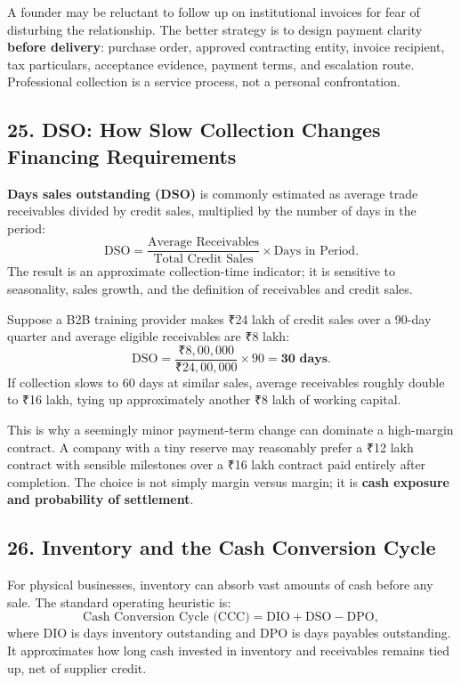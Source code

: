 A founder may be reluctant to follow up on institutional invoices for fear of disturbing the relationship. The better strategy is to design payment clarity \textbf{before delivery}: purchase order, approved contracting entity, invoice recipient, tax particulars, acceptance evidence, payment terms, and escalation route. Professional collection is a service process, not a personal confrontation.

\subsection*{25. DSO: How Slow Collection Changes Financing Requirements}

\textbf{Days sales outstanding (DSO)} is commonly estimated as average trade receivables divided by credit sales, multiplied by the number of days in the period:
\begin{equation}
\text{DSO} = \frac{\text{Average Receivables}}{\text{Total Credit Sales}} \times \text{Days in Period}.
\end{equation}
The result is an approximate collection-time indicator; it is sensitive to seasonality, sales growth, and the definition of receivables and credit sales.

Suppose a B2B training provider makes ₹24 lakh of credit sales over a 90-day quarter and average eligible receivables are ₹8 lakh:
\begin{equation}
\text{DSO} = \frac{₹8,00,000}{₹24,00,000} \times 90 = \mathbf{30\text{ days}}.
\end{equation}
If collection slows to 60 days at similar sales, average receivables roughly double to ₹16 lakh, tying up approximately another ₹8 lakh of working capital.

This is why a seemingly minor payment-term change can dominate a high-margin contract. A company with a tiny reserve may reasonably prefer a ₹12 lakh contract with sensible milestones over a ₹16 lakh contract paid entirely after completion. The choice is not simply margin versus margin; it is \textbf{cash exposure and probability of settlement}.

\subsection*{26. Inventory and the Cash Conversion Cycle}

For physical businesses, inventory can absorb vast amounts of cash before any sale. The standard operating heuristic is:
\begin{equation}
\text{Cash Conversion Cycle (CCC)} = \text{DIO} + \text{DSO} - \text{DPO},
\end{equation}
where DIO is days inventory outstanding and DPO is days payables outstanding. It approximates how long cash invested in inventory and receivables remains tied up, net of supplier credit.

